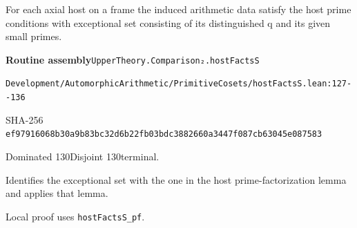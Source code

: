 
\begin{formalstatement}[D014]\label{decomp:D014}
For each axial host on a frame the induced arithmetic data satisfy the host prime conditions with exceptional set consisting of its distinguished q and its given small primes.
\end{formalstatement}
{\small\raggedright\noindent\textsf{\bfseries Routine assembly}\quad \nolinkurl{UpperTheory.Comparison₂.hostFactsS}\par\noindent \nolinkurl{Development/AutomorphicArithmetic/PrimitiveCosets/hostFactsS.lean:127--136}\par\noindent SHA-256 \nolinkurl{ef97916068b30a9b83bc32d6b22fb03bdc3882660a3447f087cb63045e087583}\par\noindent Dominated 130\quad Disjoint 130\quad terminal.\par}
Identifies the exceptional set with the one in the host prime-factorization lemma and applies that lemma.
{\small\raggedright Local proof uses \nolinkurl{hostFactsS_pf}.\par}
